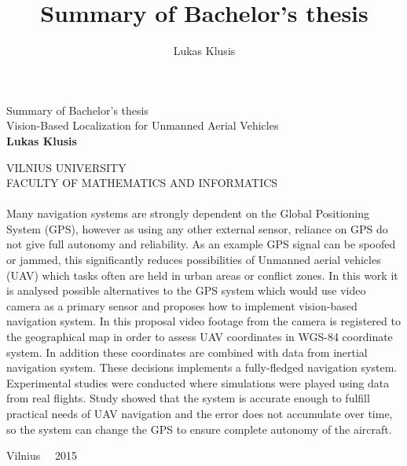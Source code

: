 \documentclass[]{article}
\title{Summary of Bachelor's thesis}
\author{Lukas Klusis}
\date{}
\begin{document}
	
	\sloppy
	
	\thispagestyle{empty}
	\begin{center}
		
		
		\LARGE{Summary of Bachelor's thesis\\}
		\vspace{0.2cm}
		\LARGE{ Vision-Based Localization for Unmanned Aerial Vehicles}\\
		\vspace{0.5cm}		
		\textbf{\large Lukas Klusis} \\
		\vspace{1cm}	
		
		\large{VILNIUS UNIVERSITY\\} 
		\vspace{0.2cm}
		\large{FACULTY OF MATHEMATICS AND INFORMATICS\\}
		\vspace{2cm}				
	\end{center}
	
	\setlength{\parindent}{4em}
	\setlength{\parskip}{1em}
	\paragraph{}
	\large
	Many navigation systems are strongly dependent on the Global Positioning System (GPS), however as using any other external sensor, reliance on GPS do not give full autonomy and reliability. As an example GPS signal can be spoofed or jammed, this significantly reduces possibilities of Unmanned aerial vehicles (UAV) which tasks often are held in urban areas or conflict zones. In this work it is analysed possible alternatives to the GPS system which would use video camera as a primary sensor and proposes how to implement vision-based navigation system. In this proposal video footage from the camera is registered to the geographical map in order to assess UAV coordinates in WGS-84 coordinate system. In addition these coordinates are combined with data from inertial navigation system. These decisions implements a fully-fledged navigation system. Experimental studies were conducted where simulations were played using data from real flights. Study showed that the system is accurate enough to fulfill practical needs of UAV navigation and the error does not accumulate over time, so the system can change the GPS to ensure complete autonomy of the aircraft.
	
	\begin{center}
		\vspace{4cm}	
		Vilnius \ \ 2015
	\end{center}	
	
	\clearpage
	
\end{document}
